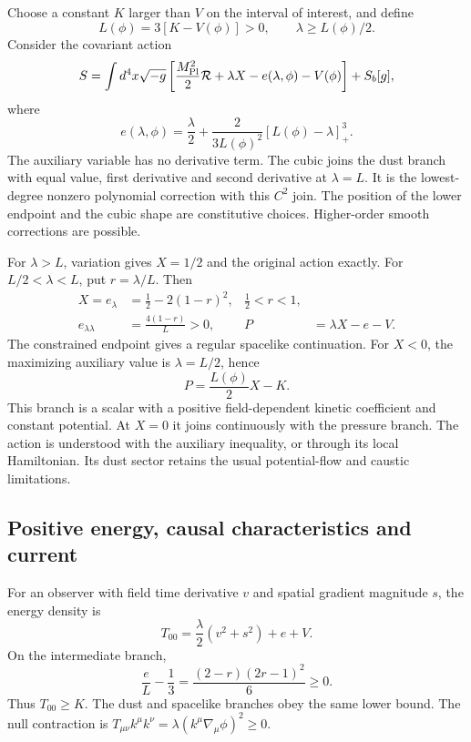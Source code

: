 \documentclass[11pt]{article}
\begin{document}
Choose a constant $K$ larger than $V$ on the interval of interest, and define
\begin{equation}
 L(\phi)=3[K-V(\phi)]>0,\qquad \lambda\ge L(\phi)/2.
\end{equation}
Consider the covariant action
\begin{equation}\label{eq:action}
 S=\int d^4x\sqrt{-g}\left[\frac{M_{\rm Pl}^2}{2}\mathcal R
       +\lambda X-e(\lambda,\phi)-V(\phi)\right]+S_b[g],
\end{equation}
where
\begin{equation}\label{eq:e}
 e(\lambda,\phi)=\frac{\lambda}{2}
       +\frac{2}{3L(\phi)^2}[L(\phi)-\lambda]_+^3.
\end{equation}
The auxiliary variable has no derivative term. The cubic joins the dust
branch with equal value, first derivative and second derivative at $\lambda=L$.
It is the lowest-degree nonzero polynomial correction with this $C^2$ join.
The position of the lower endpoint and the cubic shape are constitutive
choices. Higher-order smooth corrections are possible.

For $\lambda>L$, variation gives $X=1/2$ and the original action exactly.
For $L/2<\lambda<L$, put $r=\lambda/L$. Then
\begin{align}
 X=e_\lambda&=\tfrac12-2(1-r)^2, & \tfrac12<r<1,\label{eq:X}\\
 e_{\lambda\lambda}&=\frac{4(1-r)}{L}>0, &
 P&=\lambda X-e-V.
\end{align}
The constrained endpoint gives a regular spacelike continuation. For $X<0$,
the maximizing auxiliary value is $\lambda=L/2$, hence
\begin{equation}
 P=\frac{L(\phi)}{2}X-K.
\end{equation}
This branch is a scalar with a positive field-dependent kinetic coefficient
and constant potential. At $X=0$ it joins continuously with the pressure branch.
The action is understood with the auxiliary inequality, or through its local
Hamiltonian. Its dust sector retains the usual potential-flow and caustic
limitations.

\subsection{Positive energy, causal characteristics and current}
For an observer with field time derivative $v$ and spatial gradient magnitude
$s$, the energy density is
\begin{equation}
 T_{00}=\frac{\lambda}{2}(v^2+s^2)+e+V.
\end{equation}
On the intermediate branch,
\begin{equation}
 \frac{e}{L}-\frac13=\frac{(2-r)(2r-1)^2}{6}\ge0.
\end{equation}
Thus $T_{00}\ge K$. The dust and spacelike branches obey the same lower
bound. The null contraction is $T_{\mu\nu}k^\mu k^\nu
=\lambda(k^\mu\nabla_\mu\phi)^2\ge0$.
\end{document}
